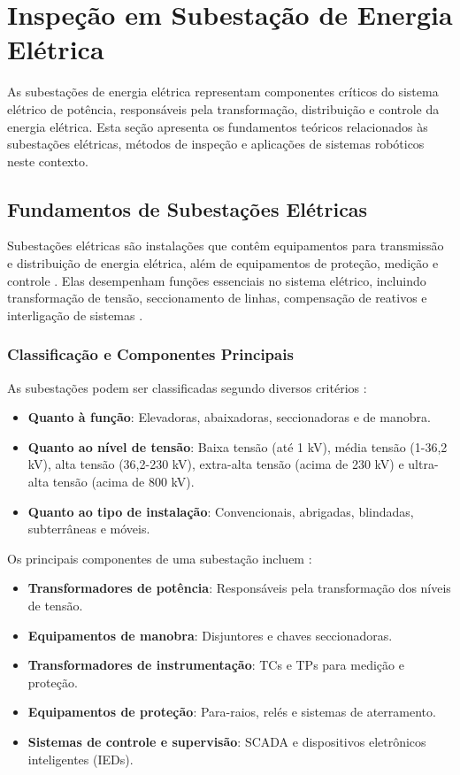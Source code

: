 \section{Inspeção em Subestação de Energia Elétrica}

As subestações de energia elétrica representam componentes críticos do sistema elétrico de potência, responsáveis pela transformação, distribuição e controle da energia elétrica. Esta seção apresenta os fundamentos teóricos relacionados às subestações elétricas, métodos de inspeção e aplicações de sistemas robóticos neste contexto.

\subsection{Fundamentos de Subestações Elétricas}

Subestações elétricas são instalações que contêm equipamentos para transmissão e distribuição de energia elétrica, além de equipamentos de proteção, medição e controle \cite{Muzy2012}. Elas desempenham funções essenciais no sistema elétrico, incluindo transformação de tensão, seccionamento de linhas, compensação de reativos e interligação de sistemas \cite{Kindermann2012}.

\subsubsection{Classificação e Componentes Principais}

As subestações podem ser classificadas segundo diversos critérios \cite{Mamede2017}:

\begin{itemize}
    \item \textbf{Quanto à função}: Elevadoras, abaixadoras, seccionadoras e de manobra.
    \item \textbf{Quanto ao nível de tensão}: Baixa tensão (até 1 kV), média tensão (1-36,2 kV), alta tensão (36,2-230 kV), extra-alta tensão (acima de 230 kV) e ultra-alta tensão (acima de 800 kV).
    \item \textbf{Quanto ao tipo de instalação}: Convencionais, abrigadas, blindadas, subterrâneas e móveis.
\end{itemize}

Os principais componentes de uma subestação incluem \cite{Frontin2013}:

\begin{itemize}
    \item \textbf{Transformadores de potência}: Responsáveis pela transformação dos níveis de tensão.
    \item \textbf{Equipamentos de manobra}: Disjuntores e chaves seccionadoras.
    \item \textbf{Transformadores de instrumentação}: TCs e TPs para medição e proteção.
    \item \textbf{Equipamentos de proteção}: Para-raios, relés e sistemas de aterramento.
    \item \textbf{Sistemas de controle e supervisão}: SCADA e dispositivos eletrônicos inteligentes (IEDs).
\end{itemize}

